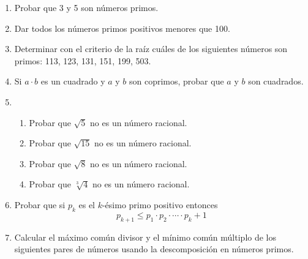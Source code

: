 \documentclass[a4paper,12pt,twoside,spanish,reqno]{amsbook}
\numberwithin{equation}{section}
\begin{document}
\begin{enumerate}
\item Probar que 3  y 5 son números primos.


\item  Dar todos los números primos positivos menores que 100.


\item Determinar con el criterio de la raíz  cuáles de los siguientes números son primos: 113, 123, 131, 151, 199, 503.


\item Si $a\cdot b$ es un cuadrado y $a$ y $b$ son coprimos, probar que $a$ y $b$ son cuadrados.


\item 
\begin{enumerate}
    \item Probar  que $\sqrt{5}$ no es un número racional.   
    \item Probar  que $\sqrt{15}$ no es un número racional.  
    \item Probar  que $\sqrt{8}$ no es un número racional.  
    \item Probar  que $\sqrt[3]{4}$ no es un número racional.
\end{enumerate}



\item Probar que si $p_k$ es el $k$-ésimo primo positivo entonces
$$p_{k+1}\leq p_1\cdot p_2\cdot \cdots \cdot p_k+1$$



\item Calcular el máximo común divisor y el mínimo común múltiplo de los siguientes pares de números usando la descomposición en números primos. 


\end{enumerate}
\end{document}
